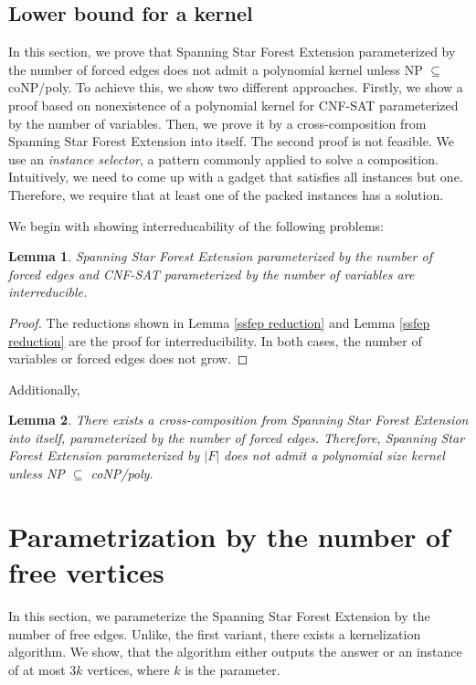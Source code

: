 \documentclass[en]{pracamgr}
\newtheorem{lemma}{Lemma}
\theoremstyle{definition}
\newcommand{\ssfep}{{\sc Spanning Star Forest Extension}}
\newcommand{\cnfsat}{{\sc CNF-SAT}}
\begin{document}
\subsection{Lower bound for a kernel}

In this section, we prove that \ssfep{} parameterized by the number of forced edges does not admit a polynomial kernel unless NP $\subseteq$ coNP/poly. To achieve this, we show two different approaches. Firstly, we show a proof based on nonexistence of a polynomial kernel for \cnfsat{} parameterized by the number of variables. Then,  we prove it by a cross-composition from \ssfep{} into itself. The second proof is not feasible. We use an \emph{instance selector}, a pattern commonly applied to solve a composition. Intuitively, we need to come up with a gadget that satisfies all instances but one. Therefore, we require that at least one of the packed instances has a solution.

We begin with showing interreducability of the following problems:

\begin{lemma}
	\ssfep{} parameterized by the number of forced edges and \cnfsat{} parameterized by the number of variables are interreducible.
\end{lemma}

\begin{proof}
	The reductions shown in Lemma \ref{ssfep reduction} and Lemma \ref{ssfep reduction} are the proof for interreducibility. In both cases, the number of variables or forced edges does not grow.
\end{proof}

Additionally, 

\begin{lemma}
	There exists a cross-composition from \ssfep{} into itself, parameterized by the number of forced edges. Therefore, \ssfep{} parameterized by $|F|$ does not admit a polynomial size kernel unless \textup{NP $\subseteq$ coNP/poly}.
\end{lemma}

\section{Parametrization by the number of free vertices}

In this section, we parameterize the \ssfep{} by the number of free edges. Unlike, the first variant, there exists a kernelization algorithm. We show, that the algorithm either outputs the answer or an instance of at most $3k$ vertices, where $k$ is the parameter.
\end{document}

